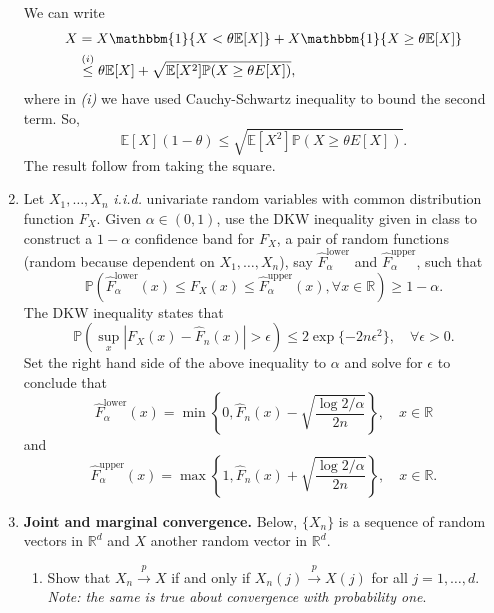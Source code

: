 \documentclass[12pt]{article}
\begin{document}
\begin{enumerate}
\color{blue}
We can write
\begin{align*}
X & = X \mathbbm{1}\{X < \theta \mathbb{E}[X]\} + X \mathbbm{1}\{X \geq \theta \mathbb{E}[X]\}\\
& \stackrel{(i)}{\leq} \theta \mathbb{E}[X] + \sqrt{\mathbb{E}[X^2] \mathbb{P}(X \geq \theta E[X])},
\end{align*}
where in {\it (i)} we have used Cauchy-Schwartz inequality to bound the second term.
So, 
\[
\mathbb{E}[X] (1 - \theta) \leq \sqrt{\mathbb{E}[X^2] \mathbb{P}(X \geq \theta E[X])}. 
\]
The result follow from taking the square.
\color{black}

\item Let $X_1,\ldots,X_n$ {\it i.i.d.} univariate random variables with common distribution function $F_X$. Given $\alpha \in (0,1)$, use the DKW inequality given in class to construct a $1 - \alpha$ confidence band for $F_X$, a pair of random functions (random because dependent on $X_1,\ldots,X_n$), say $\hat{F}^{\mathrm{lower}}_\alpha$ and $\hat{F}^{\mathrm{upper}}_\alpha$, such that
\[
\mathbb{P} \left( \hat{F}^{\mathrm{lower}}_\alpha(x) \leq F_X(x) \leq \hat{F}^{\mathrm{upper}}_\alpha(x), \forall x \in \mathbb{R}  \right) \geq 1 - \alpha.
 \]
\color{blue}
The DKW inequality states that 
\[
\mathbb{P} \left( \sup_x |F_X(x) - \hat{F}_n(x) | > \epsilon \right) \leq 2 \exp\{ -2n\epsilon^2\}, \quad \forall \epsilon > 0. 
\]
Set the right hand side of the above inequality to $\alpha$ and solve for $\epsilon$ to conclude that 
\[
\hat{F}^{\mathrm{lower}}_\alpha(x) = \min \left\{ 0 , \hat{F}_n(x) - \sqrt{\frac{\log 2/\alpha}{2 n}} \right\}, \quad x \in \mathbb{R}
\]
and
\[
\hat{F}^{\mathrm{upper}}_\alpha(x) = \max \left\{ 1 , \hat{F}_n(x) + \sqrt{\frac{\log 2/\alpha}{2 n}} \right\}, \quad x \in \mathbb{R}.
\]
\color{black}





\item {\bf Joint and marginal convergence.} Below, $\{ X_n \}$ is a sequence of random vectors in $\mathbb{R}^d$ and $X$ another random vector in $\mathbb{R}^d$.
 \begin{enumerate}
 \item Show that $X_n \stackrel{p}{\rightarrow} X$ if and only if $X_n(j) \stackrel{p}{\rightarrow} X(j)$ for all $j=1,\ldots,d$. {\it Note: the same is true about convergence with probability one}.\\
\color{blue}


\end{enumerate}
\end{enumerate}
\end{document}
